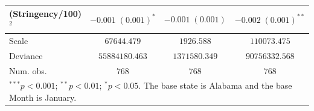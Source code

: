 \documentclass[10pt,letterpaper]{article}
\begin{document}
\begin{table}
\begin{center}
\begin{tabular}{l c c c}
(Stringency/100)$^2$ & $-0.001 \; (0.001)^{*}$   & $-0.001 \; (0.001)$       & $-0.002 \; (0.001)^{**}$  \\
\hline
Scale                & $67644.479$               & $1926.588$                & $110073.475$              \\
Deviance             & $55884180.463$            & $1371580.349$             & $90756332.568$            \\
Num. obs.            & $768$                     & $768$                     & $768$                     \\
\hline
\multicolumn{4}{l}{\scriptsize{$^{***}p<0.001$; $^{**}p<0.01$; $^{*}p<0.05$. The base state is Alabama and the base Month is January.}}
\end{tabular}
\label{regResults}
\end{center}
\end{table}
\end{document}
